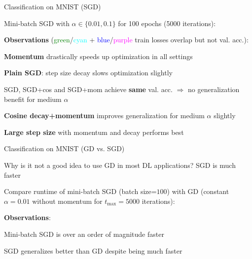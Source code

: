 \documentclass[11pt,compress,t,notes=noshow, xcolor=table]{beamer}
\begin{document}
\begin{framei}[fs=footnotesize]{Classification on MNIST (SGD)}
\item Mini-batch SGD with $\alpha \in \{0.01, 0.1\}$ for 100 epochs (5000 iterations):
\item[] \textbf{Observations} (\textcolor{green}{green}/\textcolor{cyan}{cyan} + \textcolor{blue}{blue}/\textcolor{magenta}{purple} train losses overlap but not val. acc.):
\item \textbf{Momentum} drastically speeds up optimization in all settings
\item \textbf{Plain SGD}: step size decay slows optimization slightly
\item SGD, SGD+cos and SGD+mom achieve \textbf{same} val. acc. $\Rightarrow$ no generalization benefit for medium $\alpha$
\item \textbf{Cosine decay+momentum} improves generalization for medium $\alpha$ slightly
\item \textbf{Large step size} with momentum and decay performs best
\end{framei}


\begin{framei}[fs=small]{Classification on MNIST (GD vs. SGD)}
\item Why is it not a good idea to use GD in most DL applications? SGD is much faster
\item Compare runtime of mini-batch SGD (batch size=$100$) with GD (constant $\alpha=0.01$ without momentum for $t_{\text{max}}=5000$ iterations):
\item[] \textbf{Observations}:
\item Mini-batch SGD is over an order of magnitude faster
\item SGD generalizes better than GD despite being much faster
\end{framei}

\endlecture
\end{document}
